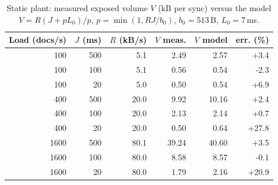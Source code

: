 \begin{table}[t]\centering\small
\caption{Static plant: measured exposed volume $V$ (kB per sync) versus the model $V=R(J+pL_0)/p$, $p=\min(1,RJ/b_0)$, $b_0=513$\,B, $L_0=7$\,ms.}\label{tab:plant}
\begin{tabular}{rrrrrr}\toprule
Load (docs/s) & $J$ (ms) & $R$ (kB/s) & $V$ meas. & $V$ model & err. (\%)\\\midrule
100 & 500 & 5.1 & 2.49 & 2.57 & +3.4\\
100 & 100 & 5.1 & 0.56 & 0.54 & -2.3\\
100 & 20 & 5.0 & 0.50 & 0.54 & +6.9\\
400 & 500 & 20.0 & 9.92 & 10.16 & +2.4\\
400 & 100 & 20.0 & 2.13 & 2.14 & +0.7\\
400 & 20 & 20.0 & 0.50 & 0.64 & +27.8\\
1600 & 500 & 80.1 & 39.24 & 40.60 & +3.5\\
1600 & 100 & 80.0 & 8.58 & 8.57 & -0.1\\
1600 & 20 & 80.0 & 1.79 & 2.16 & +20.9\\
\bottomrule\end{tabular}\end{table}
